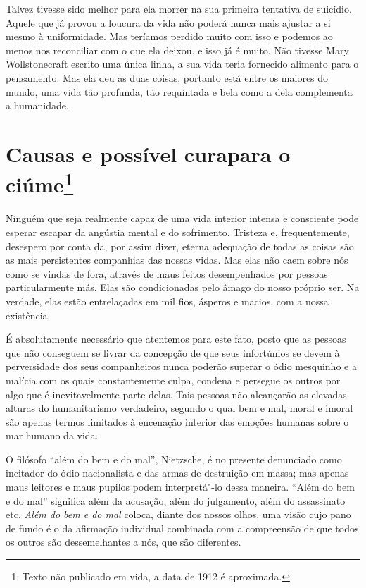 Talvez tivesse sido melhor para ela morrer na sua primeira tentativa
de suicídio. Aquele que já provou a loucura da vida não poderá nunca mais
ajustar a si mesmo à uniformidade. Mas teríamos perdido muito com isso e
podemos ao menos nos reconciliar com o que ela deixou, e isso já é
muito. Não tivesse Mary Wollstonecraft escrito uma única linha, a sua
vida teria fornecido alimento para o pensamento. Mas ela deu as duas
coisas, portanto está entre os maiores do mundo, uma vida tão profunda,
tão requintada e bela como a dela complementa a humanidade.

\chapter[Causas e possível cura para o ciúme]{Causas e possível cura\break para o ciúme\footnote{Texto não publicado em vida, a data de 1912 é aproximada.}}

Ninguém que seja realmente capaz de uma vida interior intensa e
consciente pode esperar escapar da angústia mental e do sofrimento.
Tristeza e, frequentemente, desespero por conta da, por assim dizer, eterna
adequação de todas as coisas são as mais persistentes companhias das
nossas vidas. Mas elas não caem sobre nós como se vindas de fora,
através de maus feitos desempenhados por pessoas particularmente más.
Elas são condicionadas pelo âmago do nosso próprio ser. Na verdade, elas
estão entrelaçadas em mil fios, ásperos e macios, com a nossa
existência.

É absolutamente necessário que atentemos para este fato, posto que as
pessoas que não conseguem se livrar da concepção de que seus infortúnios
se devem à perversidade dos seus companheiros nunca poderão superar o
ódio mesquinho e a malícia com os quais constantemente culpa, condena e
persegue os outros por algo que é inevitavelmente parte delas. Tais
pessoas não alcançarão as elevadas alturas do humanitarismo verdadeiro,
segundo o qual bem e mal, moral e imoral são apenas termos limitados à
encenação interior das emoções humanas sobre o mar humano da vida.

O filósofo ``além do bem e do mal'', Nietzsche, é no presente denunciado
como incitador do ódio nacionalista e das armas de destruição em massa;
mas apenas maus leitores e maus pupilos podem interpretá"-lo dessa
maneira. ``Além do bem e do mal'' significa além da acusação, além do
julgamento, além do assassinato etc. \emph{Além do bem e do mal} coloca, diante dos nossos olhos, uma visão cujo pano de fundo é o da afirmação
individual combinada com a compreensão de que todos os outros são
dessemelhantes a nós, que são diferentes.


